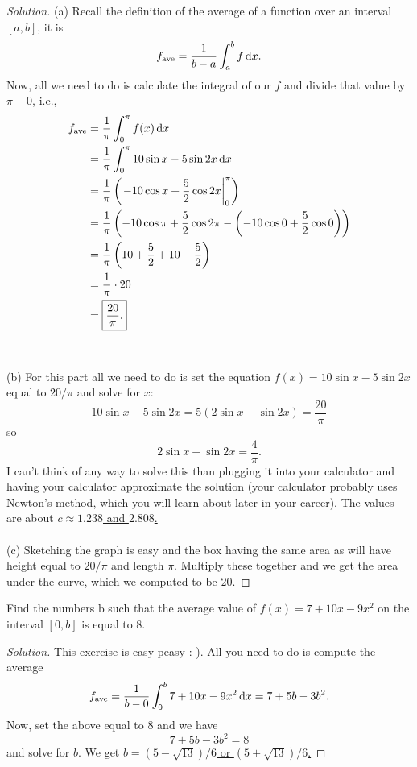 \begin{proof}[Solution]
(a) Recall the definition of the average of a function over an interval
$[a,b]$, it is
\begin{equation}
  \label{eq:average}
f_{\text{ave}}=\frac{1}{b-a}\int_a^b f\,\mathrm{d} x.
\end{equation}
Now, all we need to do is calculate the integral of our $f$ and divide that
value by $\pi-0$, i.e.,
\begingroup
\allowdisplaybreaks
\begin{align*}
f_{\text{ave}}&=\frac{1}{\pi}\int_0^\pi f(x)\,\mathrm{d} x\\
&=\frac{1}{\pi}\int_0^\pi 10\sin x-5\sin 2x\,\mathrm{d} x\\
&=\frac{1}{\pi}\left(\left.-10\cos x+\frac{5}{2}\cos
  2x\right|_0^\pi\right)\\
&=\frac{1}{\pi}\left(-10\cos\pi+\frac{5}{2}\cos 2\pi-\left(-10\cos
  0+\frac{5}{2}\cos 0\right)\right)\\
&=\frac{1}{\pi}\left(10+\frac{5}{2}+10-\frac{5}{2}\right)\\
&=\frac{1}{\pi}\cdot 20\\
&=\boxed{\frac{20}{\pi}.}
\end{align*}
\endgroup
\\\\
(b) For this part all we need to do is set the equation $f(x)=10\sin
x-5\sin 2x$ equal to $20/\pi$ and solve for $x$:
\[
10\sin x-5\sin 2x=5(2\sin x-\sin 2x)=\frac{20}{\pi}
\]
so
\[
  2\sin x-\sin 2x=\frac{4}{\pi}.
\]
I can't think of any way to solve this than plugging it into your
calculator and having your calculator approximate the solution (your
calculator probably uses
\href{https://en.wikipedia.org/wiki/Newton's_method}{Newton's method},
which you will learn about later in your career). The values are about
\ul{$c\approx 1.238$ and $2.808$.}
\\\\
(c) Sketching the graph is easy and the box having the same area as will
have height equal to $20/\pi$ and length $\pi$. Multiply these together and
we get the area under the curve, which we computed to be $20$.
\end{proof}
\begin{problem}[WebAssign, HW8, 8]
Find the numbers b such that the average value of
$f(x)=7+10x-9x^2$ on the interval $[0,b]$ is equal to $8$.
\end{problem}
\begin{proof}[Solution]
This exercise is easy-peasy :-). All you need to do is compute the average
\[
f_\text{ave}=\frac{1}{b-0}\int_0^b7+10x-9x^2\,\mathrm{d} x=7+5b-3b^2.
\]
Now, set the above equal to $8$ and we have
\[
7+5b-3b^2=8
\]
and solve for $b$. We get \ul{$b=(5-\sqrt{13})/6$ or $(5+\sqrt{13})/6$.}
\end{proof}

